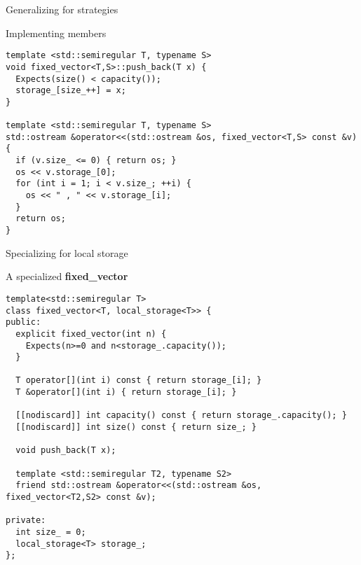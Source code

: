 \begin{frame}[t,fragile]{Generalizing for strategies}
\begin{block}{Implementing members}
\begin{lstlisting}
template <std::semiregular T, typename S>
void fixed_vector<T,S>::push_back(T x) {
  Expects(size() < capacity());
  storage_[size_++] = x;
}

template <std::semiregular T, typename S>
std::ostream &operator<<(std::ostream &os, fixed_vector<T,S> const &v) {
  if (v.size_ <= 0) { return os; }
  os << v.storage_[0];
  for (int i = 1; i < v.size_; ++i) {
    os << " , " << v.storage_[i];
  }
  return os;
}
\end{lstlisting}
\end{block}
\end{frame}

\begin{frame}[t,fragile,shrink=10]{Specializing for local storage}
\begin{block}{A specialized \textbf{fixed\_vector}}
\begin{lstlisting}
template<std::semiregular T>
class fixed_vector<T, local_storage<T>> {
public:
  explicit fixed_vector(int n) {
    Expects(n>=0 and n<storage_.capacity());
  }

  T operator[](int i) const { return storage_[i]; }
  T &operator[](int i) { return storage_[i]; }

  [[nodiscard]] int capacity() const { return storage_.capacity(); }
  [[nodiscard]] int size() const { return size_; }

  void push_back(T x);

  template <std::semiregular T2, typename S2>
  friend std::ostream &operator<<(std::ostream &os, fixed_vector<T2,S2> const &v);

private:
  int size_ = 0;
  local_storage<T> storage_;
};

\end{lstlisting}
\end{block}
\end{frame}
